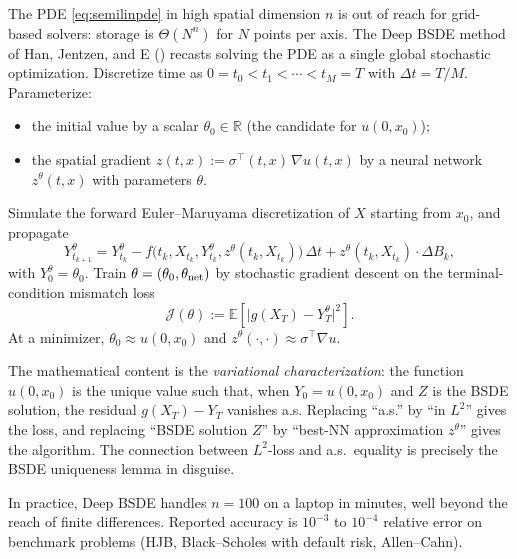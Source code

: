 \documentclass{article}
\newcommand{\E}{\mathbb{E}}
\newcommand{\R}{\mathbb{R}}
\begin{document}
The PDE \eqref{eq:semilinpde} in high spatial dimension $n$ is out of reach for grid-based solvers: storage is $\Theta(N^n)$ for $N$ points per axis. The Deep BSDE method of Han, Jentzen, and E (\cite{han-jentzen-e}) recasts solving the PDE as a single global stochastic optimization. Discretize time as $0 = t_0 < t_1 < \cdots < t_M = T$ with $\Delta t = T/M$. Parameterize:
\begin{itemize}
  \item the initial value by a scalar $\theta_0 \in \R$ (the candidate for $u(0, x_0)$);
  \item the spatial gradient $z(t, x) := \sigma^{\top}(t, x)\,\nabla u(t, x)$ by a neural network $z^\theta(t, x)$ with parameters $\theta$.
\end{itemize}
Simulate the forward Euler--Maruyama discretization of $X$ starting from $x_0$, and propagate
\[
  Y^\theta_{t_{k+1}} = Y^\theta_{t_k} - f\!\big(t_k, X_{t_k}, Y^\theta_{t_k}, z^\theta(t_k, X_{t_k})\big)\, \Delta t + z^\theta(t_k, X_{t_k}) \cdot \Delta B_k,
\]
with $Y^\theta_0 = \theta_0$. Train $\theta = (\theta_0, \theta_{\rm net})$ by stochastic gradient descent on the terminal-condition mismatch loss
\[
  \mathcal{J}(\theta) := \E\!\left[ \big| g(X_T) - Y^\theta_T \big|^2 \right].
\]
At a minimizer, $\theta_0 \approx u(0, x_0)$ and $z^\theta(\cdot, \cdot) \approx \sigma^{\top} \nabla u$.

The mathematical content is the \emph{variational characterization}: the function $u(0, x_0)$ is the unique value such that, when $Y_0 = u(0, x_0)$ and $Z$ is the BSDE solution, the residual $g(X_T) - Y_T$ vanishes a.s. Replacing ``a.s.'' by ``in $L^2$'' gives the loss, and replacing ``BSDE solution $Z$'' by ``best-NN approximation $z^\theta$'' gives the algorithm. The connection between $L^2$-loss and a.s.\ equality is precisely the BSDE uniqueness lemma in disguise.

In practice, Deep BSDE handles $n = 100$ on a laptop in minutes, well beyond the reach of finite differences. Reported accuracy is $10^{-3}$ to $10^{-4}$ relative error on benchmark problems (HJB, Black--Scholes with default risk, Allen--Cahn).
\end{document}
